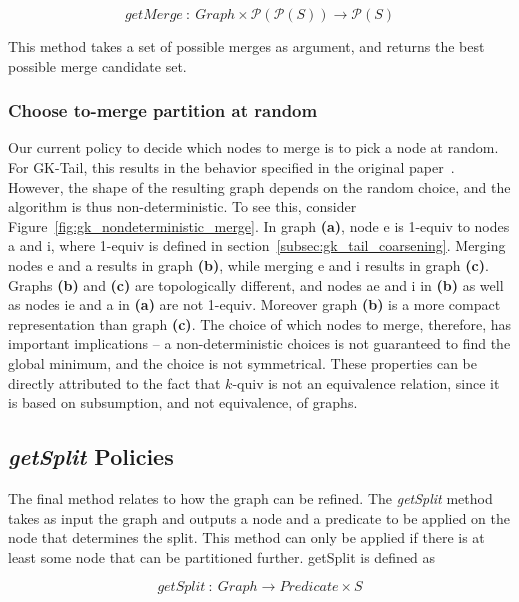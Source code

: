$$
getMerge~:~Graph\times{\mathcal{P}(\mathcal{P}(S))}\rightarrow{\mathcal{P}(S)}
$$

This method takes a set of possible merges as argument, and returns
the best possible merge candidate set.

\subsubsection{Choose to-merge partition at random}

Our current policy to decide which nodes to merge is to pick a node at
random. For GK-Tail, this results in the behavior specified in the
original paper~\cite{AGSBM}. However, the shape of the resulting graph
depends on the random choice, and the algorithm is thus
non-deterministic. To see this, consider
Figure~\ref{fig:gk_nondeterministic_merge}. In graph \textbf{(a)},
node e is 1-equiv to nodes a and i, where 1-equiv is defined in
section~\ref{subsec:gk_tail_coarsening}. Merging nodes e and a results
in graph \textbf{(b)}, while merging e and i results in graph
\textbf{(c)}. Graphs \textbf{(b)} and \textbf{(c)} are topologically
different, and nodes ae and i in \textbf{(b)} as well as nodes ie and
a in \textbf{(a)} are not 1-equiv. Moreover graph \textbf{(b)} is a
more compact representation than graph \textbf{(c)}. The choice of
which nodes to merge, therefore, has important implications -- a
non-deterministic choices is not guaranteed to find the global
minimum, and the choice is not symmetrical. These properties can be
directly attributed to the fact that $k$-quiv is not an equivalence
relation, since it is based on subsumption, and not equivalence, of
graphs.


\subsection{\textit{getSplit} Policies}

The final method relates to how the graph can be refined. The
\emph{getSplit} method takes as input the graph and outputs a node and
a predicate to be applied on the node that determines the split. This
method can only be applied if there is at least some node that can be
partitioned further. getSplit is defined as

$$
getSplit~:~Graph\rightarrow{Predicate\times{}S}
$$

